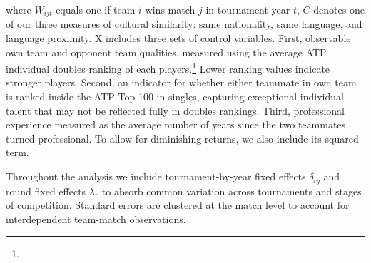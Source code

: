 \documentclass[10pt]{article}
\begin{document}
where $W_{ijt}$ equals one if team $i$ wins match $j$ in tournament-year $t$, $C$ denotes one of our three measures of cultural similarity: same nationality, same language, and language proximity. 
X includes three sets of control variables. First, observable own team and opponent team qualities, measured using the average ATP individual doubles ranking of each  players.\footnote{} Lower ranking values indicate stronger players. Second, an indicator for whether either teammate in own team is ranked inside the ATP Top 100 in singles, capturing exceptional individual talent that may not be reflected fully in doubles rankings. Third, professional experience measured as the average number of years since the two teammates turned professional. To allow for diminishing returns, we also include its squared term. 

Throughout the analysis we include tournament-by-year fixed effects $\delta_{ty}$ and round fixed effects $\lambda_r$ to absorb common variation across tournaments and stages of competition. Standard errors are clustered at the match level to account for interdependent team-match observations.
\end{document}
